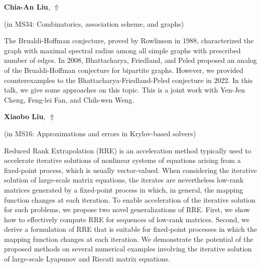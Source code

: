 \documentclass[ILAS2025-program.tex]{subfiles}
\begin{document}
\hypertarget{down0287}{}\begin{ilasabstract}
    
\textbf{Chia-An Liu},  \hfill \hyperlink{up0287}{$\Uparrow$}
    
    
(in {\color{mstitle}MS34: Combinatorics, association scheme, and graphs})
        
\mtskip
    The Brualdi-Hoffman conjecture, proved by Rowlinson in 1988, characterized the graph with maximal spectral radius among all simple graphs with prescribed number of edges. In 2008, Bhattacharya, Friedland, and Peled proposed an analog of the Brualdi-Hoffman conjecture for bipartite graphs. However, we provided counterexamples to the Bhattacharya-Friedland-Peled conjecture in 2022. In this talk, we give some approaches on this topic. This is a joint work with Yen-Jen Cheng, Feng-lei Fan, and Chih-wen Weng.
\end{ilasabstract}
    

\hypertarget{down0302}{}\begin{ilasabstract}
    
\textbf{Xiaobo Liu},  \hfill \hyperlink{up0302}{$\Uparrow$}
    
    
(in {\color{mstitle}MS16: Approximations and errors in Krylov-based solvers})
        
\mtskip
    Reduced Rank Extrapolation (RRE) is an acceleration method typically used to  accelerate iterative solutions of nonlinear systems of equations arising from a fixed-point process, which is usually vector-valued.
When considering the iterative solution of large-scale matrix equations, the iterates are nevertheless low-rank matrices generated by a fixed-point process in which, in general, the mapping function changes at each iteration.
To enable acceleration of the iterative solution for such problems, we propose two novel generalizations of RRE.
First, we show how to effectively compute RRE for sequences of low-rank matrices.
Second, we derive a formulation of RRE that is suitable for fixed-point processes in which the mapping function changes at each iteration.
We demonstrate the potential of the proposed methods on several numerical examples involving the iterative solution of large-scale Lyapunov and Riccati matrix equations.


\end{ilasabstract}
    
\end{document}
